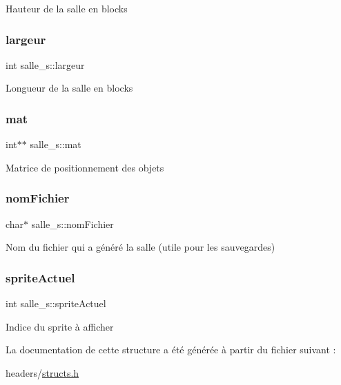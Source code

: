 Hauteur de la salle en blocks \mbox{\label{structsalle__s_ac1273e8d176620c3b9130d2f1e741315}} 
\subsubsection{\texorpdfstring{largeur}{largeur}}
{\footnotesize\ttfamily int salle\+\_\+s\+::largeur}

Longueur de la salle en blocks \mbox{\label{structsalle__s_ad9934630b58b551f8f185dead2006ba6}} 
\subsubsection{\texorpdfstring{mat}{mat}}
{\footnotesize\ttfamily int$\ast$$\ast$ salle\+\_\+s\+::mat}

Matrice de positionnement des objets \mbox{\label{structsalle__s_a12e47589795f5ed60109cf2b073ec671}} 
\subsubsection{\texorpdfstring{nom\+Fichier}{nomFichier}}
{\footnotesize\ttfamily char$\ast$ salle\+\_\+s\+::nom\+Fichier}

Nom du fichier qui a généré la salle (utile pour les sauvegardes) \mbox{\label{structsalle__s_a0305fc652ff8d07decc455bfc34ea595}} 
\subsubsection{\texorpdfstring{sprite\+Actuel}{spriteActuel}}
{\footnotesize\ttfamily int salle\+\_\+s\+::sprite\+Actuel}

Indice du sprite à afficher 

La documentation de cette structure a été générée à partir du fichier suivant \+:\begin{DoxyCompactItemize}
\item 
headers/\hyperlink{structs_8h}{structs.\+h}\end{DoxyCompactItemize}
